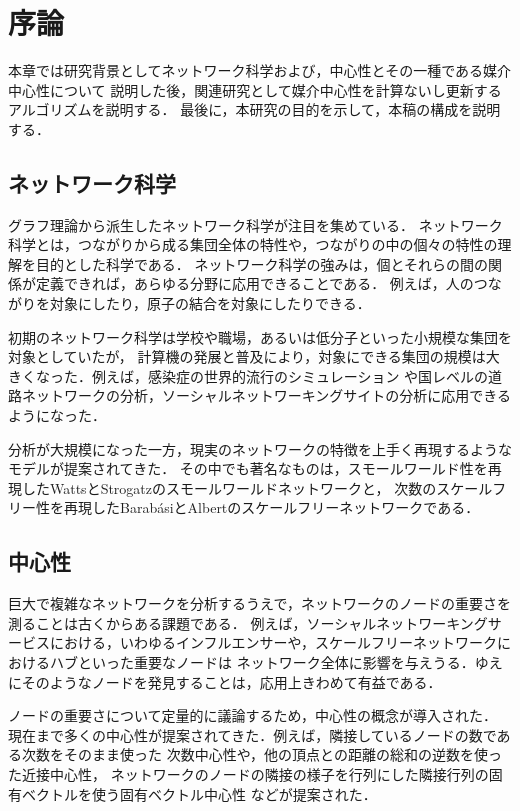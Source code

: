 \chapter{序論}
\label{chap:introduction}

本章では研究背景としてネットワーク科学および，中心性とその一種である媒介中心性について
説明した後，関連研究として媒介中心性を計算ないし更新するアルゴリズムを説明する．
最後に，本研究の目的を示して，本稿の構成を説明する．

\section{ネットワーク科学}

グラフ理論から派生したネットワーク科学が注目を集めている．
ネットワーク科学とは，つながりから成る集団全体の特性や，つながりの中の個々の特性の理解を目的とした科学である．
ネットワーク科学の強みは，個とそれらの間の関係が定義できれば，あらゆる分野に応用できることである．
例えば，人のつながりを対象にしたり，原子の結合を対象にしたりできる．

初期のネットワーク科学は学校や職場，あるいは低分子といった小規模な集団を対象としていたが，
計算機の発展と普及により，対象にできる集団の規模は大きくなった．例えば，感染症の世界的流行のシミュレーション
や国レベルの道路ネットワークの分析，ソーシャルネットワーキングサイトの分析に応用できるようになった．

分析が大規模になった一方，現実のネットワークの特徴を上手く再現するようなモデルが提案されてきた．
その中でも著名なものは，スモールワールド性を再現したWattsとStrogatzのスモールワールドネットワーク\cite{Watts1998}と，
次数のスケールフリー性を再現したBarab{\'{a}}siとAlbertのスケールフリーネットワーク\cite{Barabasi1999}である．

\section{中心性}

巨大で複雑なネットワークを分析するうえで，ネットワークのノードの重要さを測ることは古くからある課題である．
例えば，ソーシャルネットワーキングサービスにおける，いわゆるインフルエンサーや，スケールフリーネットワークにおけるハブといった重要なノードは
ネットワーク全体に影響を与えうる．ゆえにそのようなノードを発見することは，応用上きわめて有益である．

ノードの重要さについて定量的に議論するため，中心性の概念が導入された．
現在まで多くの中心性が提案されてきた．例えば，隣接しているノードの数である次数をそのまま使った
次数中心性や，他の頂点との距離の総和の逆数を使った近接中心性\cite{Beauchamp1965}，
ネットワークのノードの隣接の様子を行列にした隣接行列の固有ベクトルを使う固有ベクトル中心性
\cite{Bonacich1991}などが提案された．


